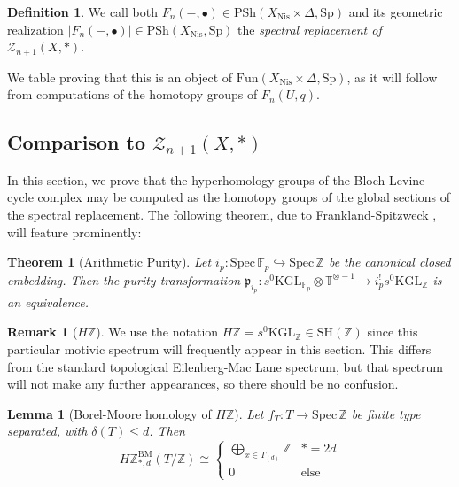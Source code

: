\documentclass[11pt, twoside]{article}
\numberwithin{equation}{section}
\newtheorem{theorem}[equation]{Theorem}
\newtheorem{lemma}[equation]{Lemma}
\theoremstyle{definition}
\newtheorem{definition}[equation]{Definition}
\newtheorem{remark}[equation]{Remark}
\newcommand{\bb}[1]{\mathbb{#1}}
\newcommand{\p}{\mathfrak{p}}
\newcommand{\spec}{\mathrm{Spec} \,}
\newcommand{\Kgl}{\mathrm{KGL}}
\newcommand{\sh}{\mathrm{SH}}
\newcommand{\Sp}{\mathrm{Sp}}
\newcommand{\bm}{\mathrm{BM}}
\newcommand{\psh}{\mathrm{PSh}}
\newcommand{\fun}{\mathrm{Fun}}
\newcommand{\nis}{\mathrm{Nis}}
\begin{document}
\begin{definition} We call both \(F_n( -, \bullet) \in \psh(X_\nis \times \Delta, \Sp)\) and its geometric realization \(|F_n( -, \bullet)| \in \psh(X_\nis, \Sp)\) the \emph{spectral replacement of \(\mathcal{Z}_{n + 1}(X, *)\)}.
\end{definition}

We table proving that this is an object of \(\fun(X_\nis \times \Delta, \Sp)\), as it will follow from computations of the homotopy groups of \(F_n(U, q)\).

\subsection{Comparison to \(\mathcal{Z}_{n + 1}(X, *)\)}
In this section, we prove that the hyperhomology groups of the Bloch-Levine cycle complex may be computed as the homotopy groups of the global sections of the spectral replacement. The following theorem, due to Frankland-Spitzweck \cite[Proposition 8.3]{FrSp}, will feature prominently:

\begin{theorem}[Arithmetic Purity]\label{thm:ar-pure}
Let \(i_p \colon \spec \bb{F}_p \hookrightarrow \spec \bb{Z}\) be the canonical closed embedding. Then the purity transformation \(\p_{i_p} \colon s^0 \Kgl_{\bb{F}_p} \otimes \bb{T}^{\otimes - 1} \to i_p^! s^0 \Kgl_\bb{Z}\) is an equivalence.
\end{theorem}

\begin{remark}[\(H\bb{Z}\)]
We use the notation \(H\bb{Z} = s^0 \Kgl_\bb{Z} \in \sh(\bb{Z})\) since this particular motivic spectrum will frequently appear in this section. This differs from the standard topological Eilenberg-Mac Lane spectrum, but that spectrum will not make any further appearances, so there should be no confusion.
\end{remark}

\begin{lemma}[Borel-Moore homology of \(H\bb{Z}\)]\label{lemm:HZBM}
Let \(f_T \colon T \to \spec \bb{Z}\) be finite type separated, with \(\delta(T) \leq d\). Then 
\begin{equation}\label{eq:HZBM}
H\bb{Z}_{*, d}^\bm(T/\bb{Z}) \cong \begin{cases} \displaystyle \bigoplus_{x \in T_{(d)}} \bb{Z} & * = 2d\\
0 & \mathrm{else} \end{cases}
\end{equation}
\end{lemma}
\end{document}

